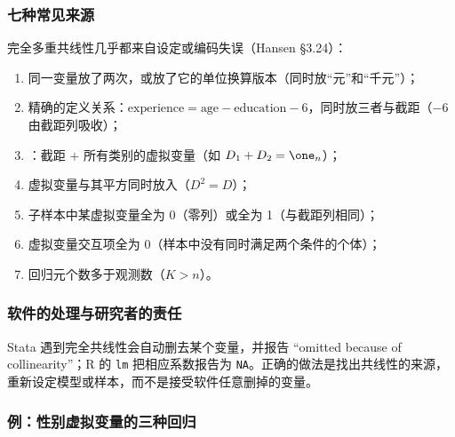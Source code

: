 \subsubsection{七种常见来源}

完全多重共线性几乎都来自设定或编码失误（Hansen §3.24）：
\begin{enumerate}[label=(\arabic*)]
  \item 同一变量放了两次，或放了它的单位换算版本（同时放“元”和“千元”）；
  \item 精确的定义关系：$\text{experience}=\text{age}-\text{education}-6$，同时放三者与截距（$-6$ 由截距列吸收）；
  \item {}：截距 $+$ 所有类别的虚拟变量（如 $D_1+D_2=\one_n$）；
  \item 虚拟变量与其平方同时放入（$D^2=D$）；
  \item 子样本中某虚拟变量全为 0（零列）或全为 1（与截距列相同）；
  \item 虚拟变量交互项全为 0（样本中没有同时满足两个条件的个体）；
  \item 回归元个数多于观测数（$K>n$）。
\end{enumerate}

\subsubsection{软件的处理与研究者的责任}

Stata 遇到完全共线性会自动删去某个变量，并报告 “omitted because of collinearity”；R 的 \texttt{lm} 把相应系数报告为 \texttt{NA}。正确的做法是找出共线性的来源，重新设定模型或样本，而不是接受软件任意删掉的变量。

\subsubsection{例：性别虚拟变量的三种回归}

